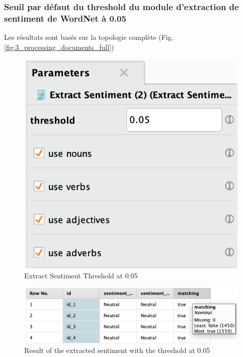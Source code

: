 \documentclass[a4paper]{article}
\begin{document}
\subsubsection{Seuil par défaut du threshold du module d'extraction de sentiment de WordNet à 0.05}
Les résultats sont basés sur la topologie complète (Fig.\ref{fig:3_processing_documents_full})
\begin{figure}[H]
\begin{center}
	\includegraphics[width=\linewidth/3]{imgs/part_3/3_processing_documents_full_0_05}
	\caption{Extract Sentiment Threshold at 0.05}
	\label{fig:3_processing_documents_full_0_05}
\end{center}
\end{figure}
\begin{figure}[H]
	\includegraphics[width=\linewidth]{imgs/part_3/3_processing_documents_full_0_05_results}
	\caption{Result of the extracted sentiment with the threshold at 0.05}
	\label{fig:3_processing_documents_full_0_05_results}
\end{figure}
\end{document}
